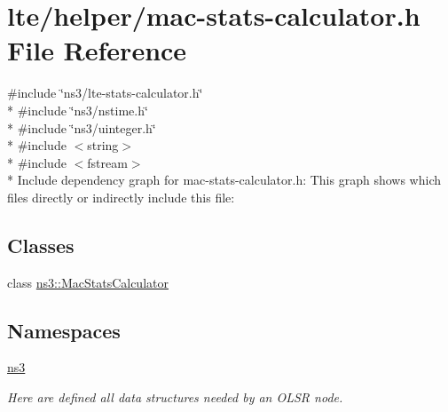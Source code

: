\hypertarget{mac-stats-calculator_8h}{}\section{lte/helper/mac-\/stats-\/calculator.h File Reference}
\label{mac-stats-calculator_8h}
{\ttfamily \#include \char`\"{}ns3/lte-\/stats-\/calculator.\+h\char`\"{}}\\*
{\ttfamily \#include \char`\"{}ns3/nstime.\+h\char`\"{}}\\*
{\ttfamily \#include \char`\"{}ns3/uinteger.\+h\char`\"{}}\\*
{\ttfamily \#include $<$string$>$}\\*
{\ttfamily \#include $<$fstream$>$}\\*
Include dependency graph for mac-\/stats-\/calculator.h\+:
This graph shows which files directly or indirectly include this file\+:
\subsection*{Classes}
\begin{DoxyCompactItemize}
\item 
class \hyperlink{classns3_1_1MacStatsCalculator}{ns3\+::\+Mac\+Stats\+Calculator}
\end{DoxyCompactItemize}
\subsection*{Namespaces}
\begin{DoxyCompactItemize}
\item 
 \hyperlink{namespacens3}{ns3}
\begin{DoxyCompactList}\small\item\em Here are defined all data structures needed by an O\+L\+SR node. \end{DoxyCompactList}\end{DoxyCompactItemize}
